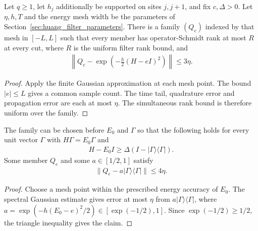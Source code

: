 \begin{lemma}
    \label{thm:huang_positive_chain_filter_family}
    \leanok
    Let $q\ge1$, let $h_j$ additionally be supported on sites $j,j+1$, and fix
    $c,\Delta>0$. Let $\eta,h,T$ and the energy mesh width be the
    parameters of Section~\ref{sec:huang_filter_parameters}.
    There is a family $(Q_e)$ indexed by that mesh in $[-L,L]$ such that
    every member has operator-Schmidt rank at most $R$ at every cut, where
    $R$ is the uniform filter rank bound, and
    \begin{align*}
        \left\|Q_e-
        \exp\!\left(-\frac h2(H-eI)^2\right)\right\|\le3\eta.
    \end{align*}
\end{lemma}
\begin{proof}
    \leanok
    Apply the finite Gaussian approximation at each mesh point.
    The bound $|e|\le L$ gives a common sample count. The time tail,
    quadrature error and propagation error are each at most $\eta$.
    The simultaneous rank bound is therefore uniform over the family.
\end{proof}

\begin{lemma}
    \label{thm:huang_positive_chain_ground_filter_family}
    \leanok
    The family can be chosen before $E_0$ and $\Gamma$ so that the following
    holds for every unit vector $\Gamma$ with $H\Gamma=E_0\Gamma$ and
    \begin{align*}
        H-E_0I\ge\Delta(I-|\Gamma\rangle\langle\Gamma|).
    \end{align*}
    Some member $Q_e$ and some $a\in[1/2,1]$ satisfy
    \begin{align*}
        \|Q_e-a|\Gamma\rangle\langle\Gamma|\|\le4\eta.
    \end{align*}
\end{lemma}
\begin{proof}
    \leanok
    Choose a mesh point within the prescribed energy accuracy of $E_0$.
    The spectral Gaussian estimate gives error at most $\eta$ from
    $a|\Gamma\rangle\langle\Gamma|$, where
    $a=\exp(-h(E_0-e)^2/2)\in[\exp(-1/2),1]$.
    Since $\exp(-1/2)\ge1/2$, the triangle inequality gives the claim.
\end{proof}

